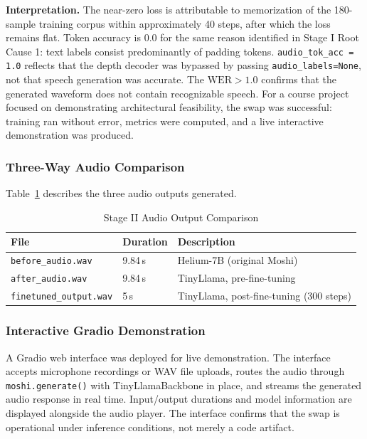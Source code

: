 \documentclass[conference]{IEEEtran}
\begin{document}
\textbf{Interpretation.}
The near-zero loss is attributable to memorization of the 180-sample training
corpus within approximately 40 steps, after which the loss remains flat.
Token accuracy is 0.0 for the same reason identified in Stage I Root Cause 1:
text labels consist predominantly of padding tokens.
\texttt{audio\_tok\_acc = 1.0} reflects that the depth decoder was bypassed
by passing \texttt{audio\_labels=None}, not that speech generation was accurate.
The $\text{WER} > 1.0$ confirms that the generated waveform does not contain
recognizable speech.
For a course project focused on demonstrating architectural feasibility, the
swap was successful: training ran without error, metrics were computed, and
a live interactive demonstration was produced.

\subsubsection{Three-Way Audio Comparison}

Table~\ref{tab:audio_compare} describes the three audio outputs generated.

\begin{table}[t]
\caption{Stage II Audio Output Comparison}
\label{tab:audio_compare}
\centering
\small
\begin{tabular}{@{}p{4.0cm}p{1.2cm}p{3.8cm}@{}}
\toprule
\textbf{File} & \textbf{Duration} & \textbf{Description} \\
\midrule
\texttt{before\_audio.wav}     & 9.84\,s & Helium-7B (original Moshi) \\
\texttt{after\_audio.wav}      & 9.84\,s & TinyLlama, pre-fine-tuning \\
\texttt{finetuned\_output.wav} & 5\,s    & TinyLlama, post-fine-tuning (300 steps) \\
\bottomrule
\end{tabular}
\end{table}

\subsubsection{Interactive Gradio Demonstration}

A Gradio web interface was deployed for live demonstration.
The interface accepts microphone recordings or WAV file uploads, routes
the audio through \texttt{moshi.generate()} with TinyLlamaBackbone in place,
and streams the generated audio response in real time.
Input/output durations and model information are displayed alongside the
audio player.
The interface confirms that the swap is operational under inference conditions,
not merely a code artifact.
\end{document}
